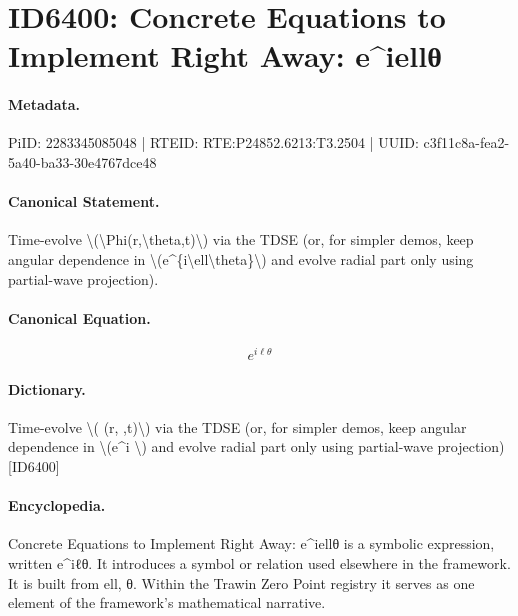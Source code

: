 \section*{ID6400: Concrete Equations to Implement Right Away: e\textasciicircum{}iellθ}
\paragraph{Metadata.}
PiID: 2283345085048 | RTEID: RTE:P24852.6213:T3.2504 | UUID: c3f11c8a-fea2-5a40-ba33-30e4767dce48

\paragraph{Canonical Statement.}
Time-evolve \textbackslash{}(\textbackslash{}Phi(r,\textbackslash{}theta,t)\textbackslash{}) via the TDSE (or, for simpler demos, keep angular dependence in \textbackslash{}(e\textasciicircum{}\{i\textbackslash{}ell\textbackslash{}theta\}\textbackslash{}) and evolve radial part only using partial-wave projection).

\paragraph{Canonical Equation.}
\[
e^{i\ell\theta}
\]

\paragraph{Dictionary.}
Time-evolve \textbackslash{}( (r, ,t)\textbackslash{}) via the TDSE (or, for simpler demos, keep angular dependence in \textbackslash{}(e\textasciicircum{}i \textbackslash{}) and evolve radial part only using partial-wave projection) [ID6400]

\paragraph{Encyclopedia.}
Concrete Equations to Implement Right Away: e\textasciicircum{}iellθ is a symbolic expression, written e\textasciicircum{}iℓθ. It introduces a symbol or relation used elsewhere in the framework. It is built from ell, θ. Within the Trawin Zero Point registry it serves as one element of the framework's mathematical narrative.
